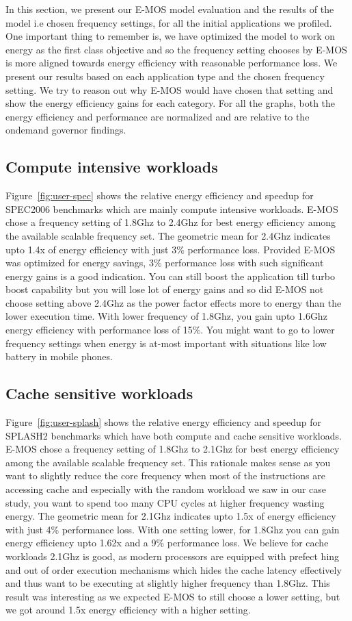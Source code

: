 In this section, we present our E-MOS model evaluation and the
results of the model i.e chosen frequency settings, for all the initial applications we profiled.
One important thing to remember is, we have optimized the model to 
work on energy as the first class objective and so the frequency setting chooses
by E-MOS is more aligned towards energy efficiency with reasonable performance loss.
We present our results based on each application type and the chosen frequency setting. 
We try to reason out why E-MOS would have chosen that setting and show the energy efficiency gains
for each category. For all the graphs, both the energy efficiency and performance are normalized
and are relative to the ondemand governor findings.

\subsection{Compute intensive workloads}
Figure~\ref{fig:user-spec} shows the relative energy efficiency and speedup
for SPEC2006 benchmarks which are mainly compute intensive workloads. 
E-MOS chose a frequency setting of 1.8Ghz to 2.4Ghz for best energy efficiency
among the available scalable frequency set. The geometric mean for 2.4Ghz indicates  
upto 1.4x of energy efficiency with just 3\% performance loss. Provided 
E-MOS was optimized for energy savings, 3\% performance loss with such significant energy gains
is a good indication. You can still boost the application till turbo boost capability
but you will lose lot of energy gains and so did E-MOS not choose setting
above 2.4Ghz as the power factor effects more to energy than the lower execution time.
With lower frequency of 1.8Ghz, you gain upto 1.6Ghz energy efficiency with performance loss
of 15\%. You might want to go to lower frequency settings when energy is at-most important with situations like
low battery in mobile phones.

\subsection{Cache sensitive workloads}
Figure~\ref{fig:user-splash} shows the relative energy efficiency and speedup
for SPLASH2 benchmarks which have both compute and cache sensitive workloads. 
E-MOS chose a frequency setting of 1.8Ghz to 2.1Ghz for best energy efficiency
among the available scalable frequency set. This rationale makes sense
as you want to slightly reduce the core frequency when most of the instructions
are accessing cache and especially with the random workload we saw in our case study,
you want to spend too many CPU cycles at higher frequency wasting energy.
The geometric mean for 2.1Ghz indicates  
upto 1.5x of energy efficiency with just 4\% performance loss.
With one setting lower, for 1.8Ghz you can gain energy efficiency upto 1.62x and a 9\% performance loss.
We believe for cache workloads 2.1Ghz is good, as modern processors are equipped with
prefect hing and out of order execution mechanisms which hides the cache latency effectively and thus 
want to be executing at slightly higher frequency than 1.8Ghz.
This result was interesting as we expected E-MOS to still choose a lower setting, but we 
got around 1.5x energy efficiency with a higher setting.

